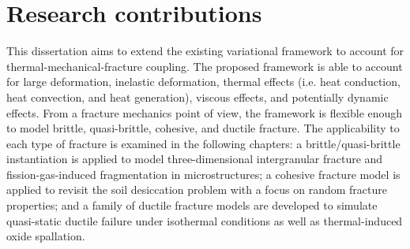 \section{Research contributions}

This dissertation aims to extend the existing variational framework to account for thermal-mechanical-fracture coupling. The proposed framework is able to account for large deformation, inelastic deformation, thermal effects (i.e. heat conduction, heat convection, and heat generation), viscous effects, and potentially dynamic effects. From a fracture mechanics point of view, the framework is flexible enough to model brittle, quasi-brittle, cohesive, and ductile fracture. The applicability to each type of fracture is examined in the following chapters: a brittle/quasi-brittle instantiation is applied to model three-dimensional intergranular fracture and fission-gas-induced fragmentation in microstructures; a cohesive fracture model is applied to revisit the soil desiccation problem with a focus on random fracture properties; and a family of ductile fracture models are developed to simulate quasi-static ductile failure under isothermal conditions as well as thermal-induced oxide spallation.


